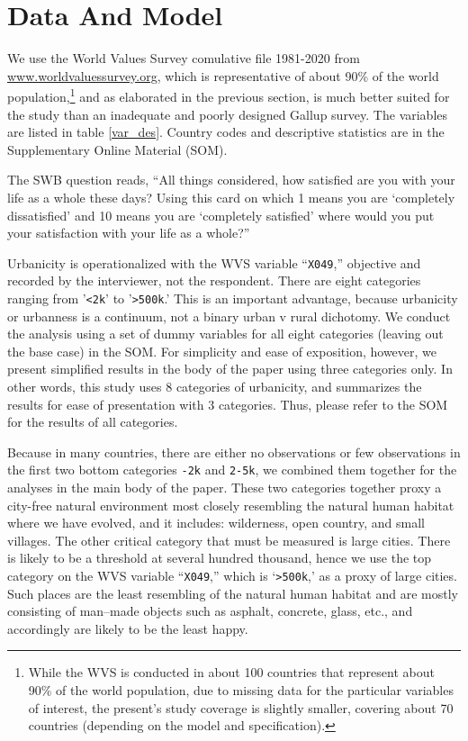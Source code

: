 \documentclass[11pt, letterpaper]{article}
\begin{document}
\section*{Data And Model}

We use the World Values Survey comulative file 1981-2020 from \url{www.worldvaluessurvey.org}, which is representative of about 90\% of
the world population,\footnote{While the WVS is conducted in about 100 countries
  that represent about 90\% of the world population, due to missing data for
  the particular variables of interest, the present's study coverage is slightly
smaller, covering about 70 countries (depending on the model and specification).} and as elaborated in the previous section, is much better suited for the study than an inadequate and poorly designed Gallup survey. The variables are listed in table \ref{var_des}. 
Country codes and descriptive statistics are in the Supplementary Online
Material (SOM).  %

The SWB question reads, ``All things considered, how  satisfied are you with your life as a whole these days? Using this card on which 1 means you are `completely dissatisfied' and 10 means you are `completely satisfied' where would you put your satisfaction with your life as a whole?''

Urbanicity is operationalized with the WVS variable ``\texttt{X049},'' objective and recorded by the interviewer, not the respondent.
There are eight categories ranging from '\texttt{<2k}' to '\texttt{>500k}.' This is an
important advantage, because %
urbanicity or urbanness is a
continuum, not a binary urban v rural dichotomy. We conduct the analysis using a
set of dummy variables for all eight categories (leaving out the base case) in
the SOM. For simplicity and ease of exposition, however,  we present simplified results in the body of the paper using three categories only.
In other words, this study uses 8 categories of urbanicity, and summarizes the results for ease of presentation with 3 categories. Thus, please refer to the SOM for the results of all categories.

Because in many countries, there are either no observations or few observations
in the first two bottom categories \texttt{-2k} and \texttt{2-5k}, we combined
them together for the analyses in the main body of the paper. These two
categories together proxy a city-free natural environment most closely
resembling the natural human habitat where we have evolved, and it includes:
wilderness, open country, and small villages. The other critical category that
must be measured %
 is large cities. There is likely to be a threshold at several hundred thousand, hence we use the top category on the WVS variable ``\texttt{X049},'' which is `\texttt{>500k},' as a proxy of large cities. Such places are the least resembling of the natural human habitat and are
mostly consisting of man--made objects such as asphalt, concrete, glass, etc.,
and accordingly are likely to be the least happy.
\end{document}
